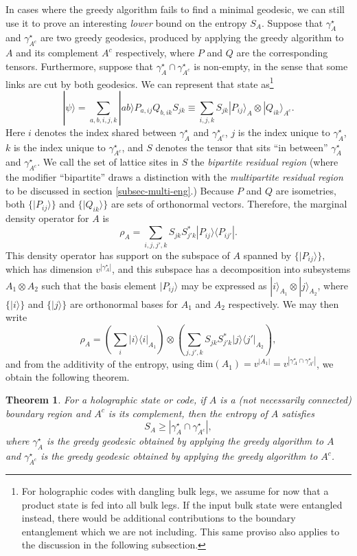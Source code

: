 \documentclass[12pt]{article}
\theoremstyle{plain}
\newtheorem{theorem}{Theorem}
\theoremstyle{plain}
\theoremstyle{plain}
\theoremstyle{plain}
\theoremstyle{result}
\theoremstyle{remark}
\theoremstyle{conjecture}
\theoremstyle{observation}
\theoremstyle{definition}
\theoremstyle{corollary}
\theoremstyle{definition}
\theoremstyle{definition}
\theoremstyle{assumption}
\theoremstyle{definition}
\theoremstyle{problem}
\theoremstyle{fact}
\newcommand{\be}{\begin{equation}}
\newcommand{\ee}{\end{equation}}
\newcommand{\lan}{\langle}
\newcommand{\ran}{\rangle}
\begin{document}
In cases where the greedy algorithm fails to find a minimal geodesic, we can still use it to prove an interesting \textit{lower} bound on the entropy $S_A$.  Suppose that $\gamma^\star_A$ and $\gamma^\star_{A^c}$ are two greedy geodesics, produced by applying the greedy algorithm to $A$ and its complement $A^c$ respectively, where $P$ and $Q$ are the corresponding tensors.  Furthermore, suppose that $\gamma^\star_A\cap\gamma^\star_{A^c}$ is non-empty, in the sense that some links are cut by both geodesics.  We can represent that state as\footnote{For holographic codes with dangling bulk legs, we assume for now that a product state is fed into all bulk legs. If the input bulk state were entangled instead, there would be additional contributions to the boundary entanglement which we are not including.  This same proviso also applies to the discussion in the following subsection.}
\be
|\psi\ran=\sum_{a,b,i,j,k} |ab\ran P_{a,ij} Q_{b,ik}S_{jk}\equiv \sum_{i,j,k} S_{jk}|P_{ij}\rangle_A\otimes |Q_{ik}\rangle_{A^c}.
\ee
Here $i$ denotes the index shared between $\gamma^\star_A$ and $\gamma^\star_{A^c}$, $j$ is the index unique to $\gamma^\star_A$, $k$ is the index unique to $\gamma^\star_{A^c}$, and $S$ denotes the tensor that sits ``in between'' $\gamma^\star_A$ and $\gamma^\star_{A^c}$.  We call the set of lattice sites in $S$ the \textit{bipartite residual region} (where the modifier ``bipartite'' draws a distinction with the \textit{multipartite residual region} to be discussed in section \ref{subsec-multi-eng}.) Because $P$ and $Q$ are isometries, both $\{|P_{ij}\rangle\}$ and $\{|Q_{ik}\rangle\}$ are sets of orthonormal vectors. Therefore, the marginal density operator for $A$ is
\be%
\rho_A=\sum_{i,j,j',k}S_{jk}S_{j'k}^*|P_{ij}\rangle\langle P_{ij'}|.
\ee
This density operator has support on the subspace of $A$ spanned by $\{|P_{ij}\rangle\}$, which has dimension $v^{|\gamma^\star_A|}$, and this subspace has a decomposition into subsystems $A_1\otimes A_2$ such that the basis element $|P_{ij}\rangle$ may be expressed as $|i\rangle_{A_1}\otimes |j\rangle_{A_2}$, where $\{|i\rangle\}$ and $\{|j\rangle\}$ are orthonormal bases for $A_1$ and $A_2$ respectively. We may then write 
\be\label{rhoA2}
\rho_A=\left(\sum_i|i\ran\lan i|_{A_1}\right)\otimes \left(\sum_{j,j',k}S_{jk}S^*_{j'k}|j\ran\lan j'|_{A_2}\right),
\ee
and from the additivity of the entropy, using $\textrm{dim}(A_1) = v^{|A_1|}=v^{|\gamma^\star_A\cap\gamma^\star_{A^c}|}$, we obtain the following theorem.

\begin{theorem}\label{thm-RT-inequality}
For a holographic state or code, if $A$ is a (not necessarily connected) boundary region and $A^c$ is its complement, then the entropy of $A$ satisfies
\be\label{residual-lowerbound}
S_A\geq |\gamma^\star_A\cap\gamma^\star_{A^c}|,
\ee
where $\gamma_A^\star$ is the greedy geodesic obtained by applying the greedy algorithm to $A$ and $\gamma_{A^c}^\star$ is the greedy geodesic obtained by applying the greedy algorithm to $A^c$.
\end{theorem}
\end{document}

